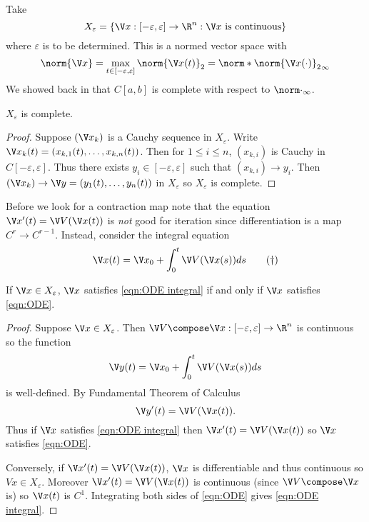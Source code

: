 \documentclass[a4paper]{article}
\theoremstyle{definition}
\begin{document}
Take
\[
  X_\varepsilon = \{\V x: [-\varepsilon, \varepsilon] \to \R^n : \V x \text{ is continuous} \}
\]
where \(\varepsilon\) is to be determined. This is a normed vector space with
\[
  \norm{\V x} = \max_{t \in [-\varepsilon, \varepsilon]}\norm{\V x(t)}_2 = \norm*{\norm{\V x(\cdot)}_2}_\infty
\]
We showed back in  that \(C[a, b]\) is complete with respect to \(\norm \cdot_\infty\).

\begin{corollary}
  \(X_\varepsilon\) is complete.
\end{corollary}

\begin{proof}
  Suppose \((\V x_k)\) is a Cauchy sequence in \(X_\varepsilon\). Write \(\V x_k(t) = (x_{k, 1}(t), \dots, x_{k, n}(t))\). Then for \(1 \leq i \leq n\), \((x_{k, i})\) is Cauchy in \(C[-\varepsilon, \varepsilon]\). Thus there exists \(y_i \in [-\varepsilon, \varepsilon]\) such that \((x_{k, i}) \to y_i\). Then \((\V x_k) \to \V y = (y_1(t), \dots, y_n(t))\) in \(X_\varepsilon\) so \(X_\varepsilon\) is complete.
\end{proof}

Before we look for a contraction map note that the equation \(\V x'(t) = \V V(\V x(t))\) is \emph{not} good for iteration since differentiation is a map \(C^r \to C^{r - 1}\). Instead, consider the integral equation
\begin{equation*}
  \label{eqn:ODE integral}
  \V x(t) = \V x_0 + \int_0^t \V V(\V x(s)) ds
  \tag{\(\dag\)}
\end{equation*}

\begin{proposition}
  If \(\V x \in X_\varepsilon\), \(\V x\) satisfies \eqref{eqn:ODE integral} if and only if \(\V x\) satisfies \eqref{eqn:ODE}.
\end{proposition}

\begin{proof}
  Suppose \(\V x \in X_\varepsilon\). Then \(\V V \compose \V x: [-\varepsilon, \varepsilon] \to \R^n\) is continuous so the function
  \[
    \V y(t) = \V x_0 + \int_{0}^{t} \V V(\V x(s)) ds
  \]
  is well-defined. By Fundamental Theorem of Calculus
  \[
    \V y'(t) = \V V(\V x(t)).
  \]
  Thus if \(\V x\) satisfies \eqref{eqn:ODE integral} then \(\V x'(t) = \V V(\V x(t))\) so \(\V x\) satisfies \eqref{eqn:ODE}.

  Conversely, if \(\V x'(t) = \V V(\V x(t))\), \(\V x\) is differentiable and thus continuous so \(V x \in X_\varepsilon\). Moreover \(\V x'(t) = \V V(\V x(t))\) is continuous (since \(\V V \compose \V x\) is) so \(\V x(t)\) is \(C^1\). Integrating both sides of \eqref{eqn:ODE} gives \eqref{eqn:ODE integral}.
\end{proof}
\end{document}
